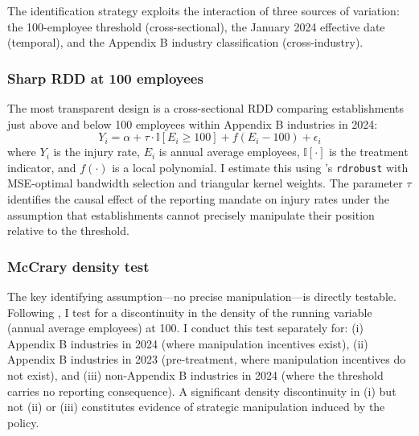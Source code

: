 \documentclass[12pt]{article}
\newcommand{\ind}{\mathbb{I}}
\begin{document}
The identification strategy exploits the interaction of three sources of variation: the 100-employee threshold (cross-sectional), the January 2024 effective date (temporal), and the Appendix B industry classification (cross-industry).

\subsubsection*{Sharp RDD at 100 employees} The most transparent design is a cross-sectional RDD comparing establishments just above and below 100 employees within Appendix B industries in 2024:
\begin{equation}\label{eq:rdd}
Y_i = \alpha + \tau \cdot \ind[E_i \geq 100] + f(E_i - 100) + \epsilon_i
\end{equation}
where $Y_i$ is the injury rate, $E_i$ is annual average employees, $\ind[\cdot]$ is the treatment indicator, and $f(\cdot)$ is a local polynomial. I estimate this using \citet{cattaneo2020}'s \texttt{rdrobust} with MSE-optimal bandwidth selection and triangular kernel weights. The parameter $\tau$ identifies the causal effect of the reporting mandate on injury rates under the assumption that establishments cannot precisely manipulate their position relative to the threshold.

\subsubsection*{McCrary density test} The key identifying assumption---no precise manipulation---is directly testable. Following \citet{mccrary2008}, I test for a discontinuity in the density of the running variable (annual average employees) at 100. I conduct this test separately for: (i) Appendix B industries in 2024 (where manipulation incentives exist), (ii) Appendix B industries in 2023 (pre-treatment, where manipulation incentives do not exist), and (iii) non-Appendix B industries in 2024 (where the threshold carries no reporting consequence). A significant density discontinuity in (i) but not (ii) or (iii) constitutes evidence of strategic manipulation induced by the policy.
\end{document}
